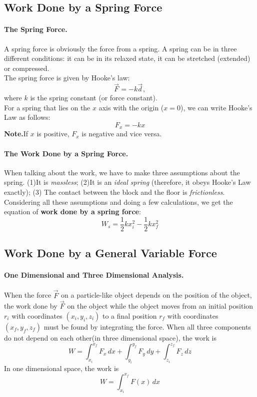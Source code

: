 \documentclass{article}
\begin{document}
\subsection{Work Done by a Spring Force}
\paragraph{The Spring Force.}A spring force is obviously the force from a spring. A spring can be in three different conditions: it can be in its relaxed state, it can be stretched (extended) or compressed.\\The spring force is given by Hooke's law:
\begin{equation}
    \vec{F}^{} = -k\vec{d}^{},
\end{equation}
where $k$ is the spring constant (or force constant).\\For a spring that lies on the $x$ axis with the origin ($x = 0$), we can write Hooke's Law as follows:
\begin{equation}
    F_x = -kx
\end{equation}
\textbf{Note.}If $x$ is positive, $F_x$ is negative and vice versa.
\paragraph{The Work Done by a Spring Force.}When talking about the work, we have to make three assumptions about the spring. (1)It is \textit{massless}; (2)It is an \textit{ideal spring} (therefore, it obeys Hooke's Law exactly); (3) The contact between the block and the floor is \textit{frictionless}.\\Considering all these assumptions and doing a few calculations, we get the equation of \textbf{work done by a spring force}:
\begin{equation}
    W_s = \frac{1}{2}kx_i^2 - \frac{1}{2}kx_f^2
\end{equation}
\subsection{Work Done by a General Variable Force}
\paragraph{One Dimensional and Three Dimensional Analysis.}When the force $\vec{F}^{}$ on a particle-like object depends on the position of the object, the work done by $\vec{F}^{}$ on the object while the object moves from an initial position $r_i$ with coordinates $(x_i, y_i, z_i)$ to a final position $r_f$ with coordinates $(x_f, y_f, z_f)$ must be found by integrating the force. When all three components do not depend on each other(in three dimensional space), the work is
\begin{equation}
    W =  \int_{x_i}^{x_f} F_x \,dx + \int_{y_i}^{y_f} F_y \,dy + \int_{z_i}^{z_f} F_z \,dz
\end{equation}
In one dimensional space, the work is
\begin{equation}
    W = \int_{x_i}^{x_f} F (x) \,dx
\end{equation}
\end{document}
